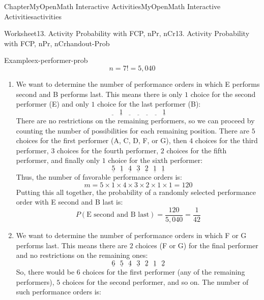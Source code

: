 \documentclass[oneside,10pt,]{book}
\begin{document}
\begin{chapterptx}{Chapter}{MyOpenMath Interactive Activities}{}{MyOpenMath Interactive Activities}{}{}{activities}
\begin{worksheet-section}{Worksheet}{13. Activity Probability with FCP, nPr, nCr}{}{13. Activity Probability with FCP, nPr, nCr}{}{}{handout-Prob}
\begin{example}{Example}{}{ex-performer-prob}
\begin{equation*}
n = 7! = 5,040
\end{equation*}
%
\par
%
\begin{enumerate}[label={\alph*}]
\item{}We want to determine the number of performance orders in which E performs second and B performs last. This means there is only \(1\) choice for the second performer (E) and only \(1\) choice for the last performer (B):%
\begin{equation*}
\underline{\quad} \ \underline{\ 1\ } \ \underline{\quad} \ \underline{\quad} \ \underline{\quad} \ \underline{\quad} \ \underline{\ 1\ }
\end{equation*}
There are no restrictions on the remaining performers, so we can proceed by counting the number of possibilities for each remaining position. There are \(5\) choices for the first performer (A, C, D, F, or G), then \(4\) choices for the third performer, \(3\) choices for the fourth performer, \(2\) choices for the fifth performer, and finally only \(1\) choice for the sixth performer:%
\begin{equation*}
\underline{\ 5\ } \ \underline{\ 1\ } \ \underline{\ 4\ } \ \underline{\ 3\ } \ \underline{\ 2\ } \ \underline{\ 1\ } \ \underline{\ 1\ }
\end{equation*}
Thus, the number of favorable performance orders is:%
\begin{equation*}
m = 5 \times 1 \times 4 \times 3 \times 2 \times 1 \times 1 = 120
\end{equation*}
Putting this all together, the probability of a randomly selected performance order with E second and B last is:%
\begin{equation*}
P(\text{E second and B last}) = \frac{120}{5,040} = \frac{1}{42}
\end{equation*}
%
\item{}We want to determine the number of performance orders in which F or G performs last. This means there are \(2\) choices (F or G) for the final performer and no restrictions on the remaining ones:%
\begin{equation*}
\underline{\ 6\ } \ \underline{\ 5\ } \ \underline{\ 4\ } \ \underline{\ 3\ } \ \underline{\ 2\ } \ \underline{\ 1\ } \ \underline{\ 2\ }
\end{equation*}
So, there would be \(6\) choices for the first performer (any of the remaining performers), \(5\) choices for the second performer, and so on. The number of such performance orders is:%

\end{enumerate}
\end{example}
\end{worksheet-section}
\end{chapterptx}
\end{document}
